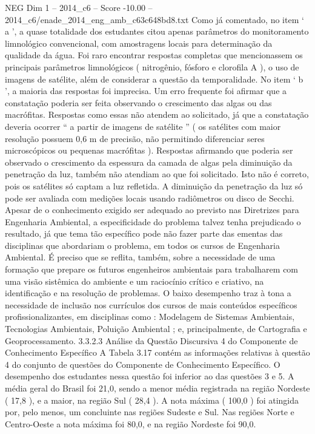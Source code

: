 \begin{textsample}{NEG Dim 1 – 2014\_c6 – Score -10.00 – 2014\_c6/enade\_2014\_eng\_amb\_c63c648bd8.txt}
Como já comentado, no item ‘ a ’, a quase totalidade dos estudantes citou apenas parâmetros do monitoramento limnológico convencional, com amostragens locais para determinação da qualidade da água.
Foi raro encontrar respostas completas que mencionassem os principais parâmetros limnológicos ( nitrogênio, fósforo e clorofila A ), o uso de imagens de satélite, além de considerar a questão da temporalidade.
No item ‘ b ’, a maioria das respostas foi imprecisa.
Um erro frequente foi afirmar que a constatação poderia ser feita observando o crescimento das algas ou das macrófitas.
Respostas como essas não atendem ao solicitado, já que a constatação deveria ocorrer “ a partir de imagens de satélite ” ( os satélites com maior resolução possuem 0,6 m de precisão, não permitindo diferenciar seres microscópicos ou pequenas macrófitas ).
Respostas afirmando que poderia ser observado o crescimento da espessura da camada de algas pela diminuição da penetração da luz, também não atendiam ao que foi solicitado.
Isto não é correto, pois os satélites só captam a luz refletida.
A diminuição da penetração da luz só pode ser avaliada com medições locais usando radiômetros ou disco de Secchi.
Apesar de o conhecimento exigido ser adequado ao previsto nas Diretrizes para Engenharia Ambiental, a especificidade do problema talvez tenha prejudicado o resultado, já que tema tão específico pode não fazer parte das ementas das disciplinas que abordariam o problema, em todos os cursos de Engenharia Ambiental.
É preciso que se reflita, também, sobre a necessidade de uma formação que prepare os futuros engenheiros ambientais para trabalharem com uma visão sistêmica do ambiente e um raciocínio crítico e criativo, na identificação e na resolução de problemas.
O baixo desempenho traz à tona a necessidade de inclusão nos currículos dos cursos de mais conteúdos específicos profissionalizantes, em disciplinas como : Modelagem de Sistemas Ambientais, Tecnologias Ambientais, Poluição Ambiental ; e, principalmente, de Cartografia e Geoprocessamento. 3.3.2.3 Análise da Questão Discursiva 4 do Componente de Conhecimento Específico A Tabela 3.17 contém as informações relativas à questão 4 do conjunto de questões do Componente de Conhecimento Específico.
O desempenho dos estudantes nessa questão foi inferior ao das questões 3 e 5.
A média geral do Brasil foi 21,0, sendo a menor média registrada na região Nordeste ( 17,8 ), e a maior, na região Sul ( 28,4 ).
A nota máxima ( 100,0 ) foi atingida por, pelo menos, um concluinte nas regiões Sudeste e Sul.
Nas regiões Norte e Centro-Oeste a nota máxima foi 80,0, e na região Nordeste foi 90,0.

\end{textsample}

